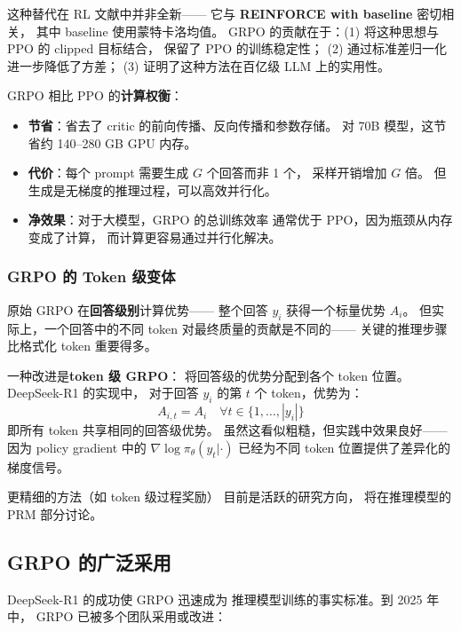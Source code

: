 这种替代在 RL 文献中并非全新——
它与 \textbf{REINFORCE with baseline} 密切相关，
其中 baseline 使用蒙特卡洛均值。
GRPO 的贡献在于：(1) 将这种思想与 PPO 的 clipped 目标结合，
保留了 PPO 的训练稳定性；
(2) 通过标准差归一化进一步降低了方差；
(3) 证明了这种方法在百亿级 LLM 上的实用性。

GRPO 相比 PPO 的\textbf{计算权衡}：
\begin{itemize}[noitemsep]
  \item \textbf{节省}：省去了 critic 的前向传播、反向传播和参数存储。
        对 70B 模型，这节省约 140--280 GB GPU 内存。
  \item \textbf{代价}：每个 prompt 需要生成 $G$ 个回答而非 1 个，
        采样开销增加 $G$ 倍。
        但生成是无梯度的推理过程，可以高效并行化。
  \item \textbf{净效果}：对于大模型，GRPO 的总训练效率
        通常优于 PPO，因为瓶颈从内存变成了计算，
        而计算更容易通过并行化解决。
\end{itemize}

\subsubsection{GRPO 的 Token 级变体}

原始 GRPO 在\textbf{回答级别}计算优势——
整个回答 $y_i$ 获得一个标量优势 $A_i$。
但实际上，一个回答中的不同 token
对最终质量的贡献是不同的——
关键的推理步骤比格式化 token 重要得多。

一种改进是\textbf{token 级 GRPO}：
将回答级的优势分配到各个 token 位置。
DeepSeek-R1 的实现中，
对于回答 $y_i$ 的第 $t$ 个 token，优势为：
\begin{equation}
  A_{i,t} = A_i \quad \forall t \in \{1, \ldots, |y_i|\}
\end{equation}
即所有 token 共享相同的回答级优势。
虽然这看似粗糙，但实践中效果良好——
因为 policy gradient 中的 $\nabla \log \pi_\theta(y_t | \cdot)$
已经为不同 token 位置提供了差异化的梯度信号。

更精细的方法（如 token 级过程奖励）
目前是活跃的研究方向，
将在推理模型的 PRM 部分讨论。

\subsection{GRPO 的广泛采用}

DeepSeek-R1 的成功使 GRPO 迅速成为
推理模型训练的事实标准。到 2025 年中，
GRPO 已被多个团队采用或改进：

